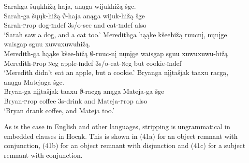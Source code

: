 \documentclass[output=paper]{LSP/langsci}
\begin{document}
\begin{exe}
\ex
\begin{xlist}
\ex
\glll Sarahga \v{s}\k{u}\k{u}khi\v{z}\k{a} haja, an\k{a}ga wijukhi\v{z}\k{a} \v{s}ge.\\
Sarah-ga \v{s}\k{u}\k{u}k-hi\v{z}\k{a} $\emptyset$-haja an\k{a}ga wijuk-hi\v{z}\k{a} \v{s}ge\\
Sarah-{\textsc prop} dog-{\textsc indef} {\textsc 3s/o}-see and cat-{\textsc indef} also\\
\trans `Sarah saw a dog, and a cat too.'
 \ex
\glll Meredithga h\k{a}\k{a}ke k\v{s}eehi\v{z}\k{a} ruucn\k{i}, n\k{u}n\k{i}ge {waisgap sguu xuwuxuwuhi\v{z}\k{a}}.\\
Meredith-ga h\k{a}\k{a}ke k\v{s}ee-hi\v{z}\k{a} $\emptyset$-ruuc-n\k{i} n\k{u}n\k{i}ge {waisgap sguu xuwuxuwu-hi\v{z}\k{a}}\\
Meredith-{\textsc prop} {\textsc neg} apple-{\textsc indef} {\textsc 3s/o}-eat-{\textsc neg} but cookie-{\textsc indef}\\
\trans `Meredith didn't eat an apple, but a cookie.'
 \ex
\glll Bryanga {n\k{i}\k{i}ta\v{s}jak taaxu} racg\k{a}, an\k{a}ga Matejaga \v{s}ge.\\
Bryan-ga {n\k{i}\k{i}ta\v{s}jak taaxu} $\emptyset$-racg\k{a} an\k{a}ga Mateja-ga \v{s}ge\\
Bryan-{\textsc prop} coffee {\textsc 3s}-drink and Mateja-{\textsc prop} also\\
\trans `Bryan drank coffee, and Mateja too.'
\end{xlist}
\end{exe}


As is the case in English and other languages, stripping is ungrammatical in embedded clauses in Hoc\k{a}k. This is shown in (41a) for an object remnant with conjunction, (41b) for an object remnant with disjunction and (41c) for a subject remnant with conjunction.
\end{document}
